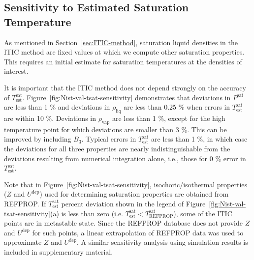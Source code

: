 \documentclass[5p,times]{elsarticle}
\begin{document}
\subsection{Sensitivity to Estimated Saturation Temperature} \label{sec:tsat-sensitivity}
As mentioned in Section~\ref{sec:ITIC-method}, saturation liquid densities in the ITIC method are fixed values at which we compute other saturation properties. This requires an initial estimate for saturation temperatures at the densities of interest.
 
It is important that the ITIC method does not depend strongly on the accuracy of $T^\mathrm{sat}_\mathrm{est}$. Figure~\ref{fig:Nist-val-tsat-sensitivity} demonstrates that deviations in $P^\mathrm{sat}$ are less than 1 \% and deviations in $\rho_\mathrm{liq}$ are less than 0.25 \% when errors in $T^\mathrm{sat}_\mathrm{est}$ are within 10 \%. Deviations in $\rho_\mathrm{vap}$ are less than 1 \%, except for the high temperature point for which deviations are smaller than 3 \%. This can be improved by including $B_3$. Typical errors in $T^\mathrm{sat}_\mathrm{est}$ are less than 1 \%, in which case the deviations for all three properties are nearly indistinguishable from the deviations resulting from numerical integration alone, i.e., those for 0 \% error in $T^\mathrm{sat}_\mathrm{est}$. 

Note that in Figure~\ref{fig:Nist-val-tsat-sensitivity}, isochoric/isothermal properties ($Z$ and $U^\mathrm{dep}$) used for determining saturation properties are obtained from REFPROP. If $T^\mathrm{sat}_\mathrm{est}$ percent deviation shown in the legend of Figure~\ref{fig:Nist-val-tsat-sensitivity}(a) is less than zero (i.e. $T^\mathrm{sat}_\mathrm{est} < T^\mathrm{sat}_\mathrm{REFPROP}$), some of the ITIC points are in metastable state. Since the REFPROP database does not provide $Z$ and $U^\mathrm{dep}$ for such points, a linear extrapolation of REFPROP data was used to approximate $Z$ and $U^\mathrm{dep}$. A similar sensitivity analysis using simulation results is included in supplementary material.
\end{document}
